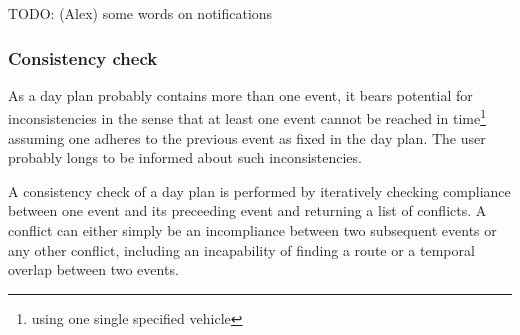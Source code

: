 TODO: (Alex) some words on notifications

\subsubsection{Consistency check}

As a day plan probably contains more than one event, it bears potential for inconsistencies in the sense that at least one event cannot be reached in time\footnote{using one single specified vehicle} assuming one adheres to the previous event as fixed in the day plan. The user probably longs to be informed about such inconsistencies.\newline

A consistency check of a day plan is performed by iteratively checking compliance between one event and its preceeding event and returning a list of conflicts. A conflict can either simply be an incompliance between two subsequent events or any other conflict, including an incapability of finding a route or a temporal overlap between two events.












